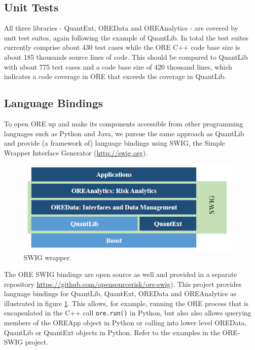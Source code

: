 \documentclass[12pt, a4paper]{article}
\begin{document}
\subsection*{Unit Tests}
All three libraries - QuantExt, OREData and OREAnalytics - are covered by unit test suites, again following the example of QuantLib. In total the test suites currently
comprise about 430 test cases while the ORE C++ code base size is about 185 thousands source lines of code. This should be compared to QuantLib with about 775 test cases and a code base size of 420 thousand lines, which indicates a code coverage
in ORE that exceeds the coverage in QuantLib.

\subsection*{Language Bindings}
To open ORE up and make its components accessible from other programming languages such as Python and Java, we pursue the same approach as QuantLib and provide (a framework of) language bindings using SWIG, the Simple Wrapper
Interface Generator (\url{http://swig.org}).

\begin{figure}[h]
\begin{center}
\includegraphics[scale=0.6]{OverviewSWIG}
\end{center}
\caption{SWIG wrapper. }
\label{fig_SWIG}
\end{figure}

The ORE SWIG bindings are open source as well and provided in a separate repository \url{https://github.com/opensourcerisk/ore-swig}). This project provides language bindings for QuantLib, QuantExt, OREData and OREAnalytics as illustrated in figure 
\ref{fig_SWIG}. This allows, for example, running the ORE process that is encapsulated in the C++ call {\tt ore.run()} in Python, but also also allows querying members of the OREApp object in Python or calling into lower level OREData, QuantLib or
QuantExt objects in Python. Refer to the examples in the ORE-SWIG project.
\end{document}
